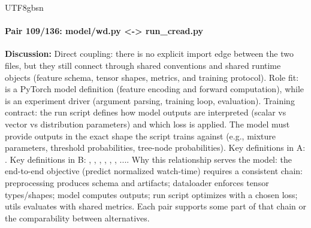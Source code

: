 \documentclass[11pt]{article}
\begin{document}
\begin{CJK*}{UTF8}{gbsn}
\paragraph{Pair 109/136: model/wd.py <-> run\_cread.py}
\textbf{Discussion:} Direct coupling: there is no explicit import edge between the two files, but they still connect through shared conventions and shared runtime objects (feature schema, tensor shapes, metrics, and training protocol). Role fit: \texttt{} is a PyTorch model definition (feature encoding and forward computation), while \texttt{} is an experiment driver (argument parsing, training loop, evaluation). Training contract: the run script defines how model outputs are interpreted (scalar vs vector vs distribution parameters) and which loss is applied. The model must provide outputs in the exact shape the script trains against (e.g., mixture parameters, threshold probabilities, tree-node probabilities). Key definitions in A: \texttt{}. Key definitions in B: \texttt{}, \texttt{}, \texttt{}, \texttt{}, \texttt{}, \texttt{}, .... Why this relationship serves the model: the end-to-end objective (predict normalized watch-time) requires a consistent chain: preprocessing produces schema and artifacts; dataloader enforces tensor types/shapes; model computes outputs; run script optimizes with a chosen loss; utils evaluates with shared metrics. Each pair supports some part of that chain or the comparability between alternatives.


\end{CJK*}
\end{document}
